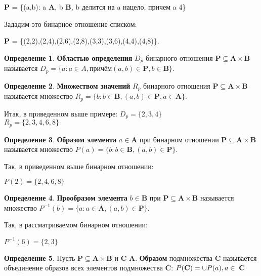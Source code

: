 \documentclass[12pt, a4paper, oneside]{article}
\theoremstyle{plain} %
\theoremstyle{definition}
\newtheorem*{definition}{Определение}  %
\newcommand{\indef}[1]{\textbf{ \color{dark_red} #1}}
\begin{document}
\textbf{P} = \{(a,b): a \in \textbf{A}, b \in \textbf{B}, b делится на a нацело, причем a \leq \hspace{2mm} 4\} 


Зададим это бинарное отношение списком:


\textbf{P} = \{(2,2),(2,4),(2,6),(2,8),(3,3),(3,6),(4,4),(4,8)\}.

\begin{definition}
\indef{Областью определения} $D_p$ бинарного отношения $\textbf{P} \subseteq \textbf{A} \times \textbf{B}$ называется $D_p = \{a: a \in A, причём (a,b) \in \textbf{P}, b \in \textbf{B}\}$. 
\end{definition}

\begin{definition}
\indef{Множеством значений} $R_p$ бинарного отношения $\textbf{P} \subseteq \textbf{A} \times \textbf{B}$ называется множество $R_p = \{b: b \in \textbf{B}, (a,b) \in \textbf{P},
a \in \textbf{A}\}$.
\end{definition}

Итак, в приведенном выше примере: 
$D_p = \{2,3,4\}$ \\
$R_p = \{2,3,4,6,8\}$

\begin{definition}
\indef{Образом элемента} $a \in \textbf{A}$ при бинарном отношении $\textbf{P} \subseteq \textbf{A} \times \textbf{B}$ называется множество $P(a) = \{b: b \in \textbf{B}, (a,b) \in \textbf{P}\}$.
\end{definition}

Так, в приведенном выше бинарном отношении: 


$P(2) = \{2,4,6,8\}$

\begin{definition}
\indef{Прообразом элемента} $b \in \textbf{B}$ при $\textbf{P} \subseteq \textbf{A} \times \textbf{B}$ называется множество $P^{-1} (b) = \{a: a \in \textbf{A}, (a,b) \in \textbf{P}\}$.
\end{definition}

Так, в рассматриваемом бинарном отношении: 


\(P^{-1}(6) = \{2,3\}\)

\begin{definition}
Пусть $\textbf{P} \subseteq \textbf{A} \times \textbf{B}$ и \textbf{C} \subseteq \textbf{A}. \indef{Образом} подмножества \textbf{C} называется объединение образов всех элементов подмножества \textbf{C}: $P(\textbf{C}) = \cup P(a), a \in \hspace{1mm}\textbf{C}$
\end{definition}
\end{document}
